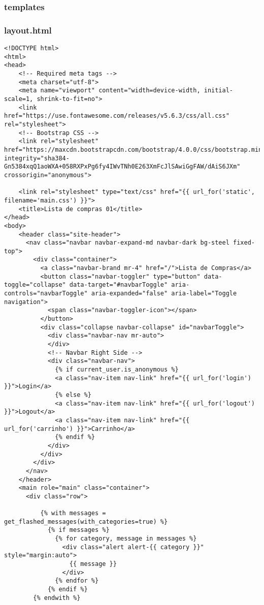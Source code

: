 \documentclass{report}
\begin{document}
\subsubsection{templates}
\subsubsection{layout.html}
\begin{lstlisting}
<!DOCTYPE html>
<html>
<head>
    <!-- Required meta tags -->
    <meta charset="utf-8">
    <meta name="viewport" content="width=device-width, initial-scale=1, shrink-to-fit=no">
    <link href="https://use.fontawesome.com/releases/v5.6.3/css/all.css" rel="stylesheet">
    <!-- Bootstrap CSS -->
    <link rel="stylesheet" href="https://maxcdn.bootstrapcdn.com/bootstrap/4.0.0/css/bootstrap.min.css" integrity="sha384-Gn5384xqQ1aoWXA+058RXPxPg6fy4IWvTNh0E263XmFcJlSAwiGgFAW/dAiS6JXm" crossorigin="anonymous">

    <link rel="stylesheet" type="text/css" href="{{ url_for('static', filename='main.css') }}">
    <title>Lista de compras 01</title>
</head>
<body>
    <header class="site-header">
      <nav class="navbar navbar-expand-md navbar-dark bg-steel fixed-top">
        <div class="container">
          <a class="navbar-brand mr-4" href="/">Lista de Compras</a>
          <button class="navbar-toggler" type="button" data-toggle="collapse" data-target="#navbarToggle" aria-controls="navbarToggle" aria-expanded="false" aria-label="Toggle navigation">
            <span class="navbar-toggler-icon"></span>
          </button>
          <div class="collapse navbar-collapse" id="navbarToggle">
            <div class="navbar-nav mr-auto">
            </div>
            <!-- Navbar Right Side -->
            <div class="navbar-nav">
              {% if current_user.is_anonymous %}
              <a class="nav-item nav-link" href="{{ url_for('login') }}">Login</a>
              {% else %}
              <a class="nav-item nav-link" href="{{ url_for('logout') }}">Logout</a>
              <a class="nav-item nav-link" href="{{ url_for('carrinho') }}">Carrinho</a>
              {% endif %}
            </div>
          </div>
        </div>
      </nav>
    </header>
    <main role="main" class="container">
      <div class="row">

          {% with messages = get_flashed_messages(with_categories=true) %}
            {% if messages %}
              {% for category, message in messages %}
                <div class="alert alert-{{ category }}" style="margin:auto">
                  {{ message }}
                </div>
              {% endfor %}
            {% endif %}
        {% endwith %}


\end{lstlisting}
\end{document}
